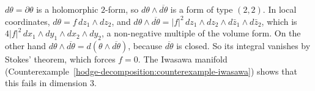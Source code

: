 \begin{solution}
$d\theta = \partial\theta$ is a holomorphic $2$-form, so $d\theta \wedge \overline{d\theta}$ is a form of type $(2,2)$. In local
coordinates, $d\theta = f\,dz_1 \wedge dz_2$, and $d\theta \wedge \overline{d\theta} = |f|^2\,dz_1 \wedge dz_2 \wedge d\bar z_1 \wedge d\bar z_2$,
which is $4|f|^2\,dx_1 \wedge dy_1 \wedge dx_2 \wedge dy_2$, a non-negative multiple of the volume form. On the other
hand $d\theta \wedge \overline{d\theta} = d(\theta \wedge \overline{d\theta})$, because $\overline{d\theta}$ is closed. So its integral
vanishes by Stokes' theorem, which forces $f = 0$. The Iwasawa manifold (Counterexample~\ref{hodge-decomposition:counterexample-iwasawa})
shows that this fails in dimension $3$.
\end{solution}
